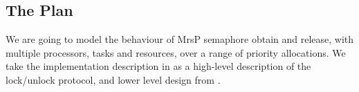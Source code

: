 \subsection{The Plan}

We are going to model the behaviour of MrsP semaphore obtain and release,
with multiple processors, tasks and resources,
over a range of priority allocations.
We take the implementation description in
\cite[Sec VIII, pp288--9]{Burns:2013:MrsP}
as a high-level description of the lock/unlock protocol,
and lower level design from
\cite[Chp. 5, App. 2]{Gomes:2019:MrsP}.
